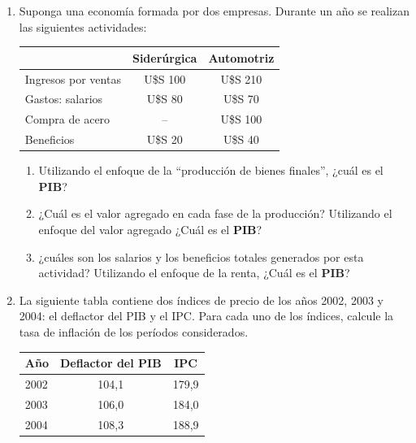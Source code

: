 \documentclass[11pt,addpoints]{article}
\begin{document}
\begin{enumerate}
\item Suponga una economía formada por dos empresas. Durante un año se realizan las siguientes
actividades:
\begin{center}
\begin{tabular}{lcc}
\toprule
 & \textbf{Siderúrgica} & \textbf{Automotriz}\\
\midrule
Ingresos por ventas & U\$S 100 & U\$S 210\\
Gastos: salarios & U\$S 80 & U\$S 70\\
Compra de acero & -- & U\$S 100\\
Beneficios & U\$S 20 & U\$S 40\\
\bottomrule
\end{tabular}
\end{center}
\begin{enumerate}[label=(\alph*)]
\item Utilizando el enfoque de la “producción de bienes finales”, ¿cuál es el \textbf{PIB}?
\item ¿Cuál es el valor agregado en cada fase de la producción? Utilizando el enfoque del valor
agregado ¿Cuál es el \textbf{PIB}?
\item ¿cuáles son los salarios y los beneficios totales generados por esta actividad? Utilizando
el enfoque de la renta, ¿Cuál es el \textbf{PIB}?
\end{enumerate}

\item La siguiente tabla contiene dos índices de precio de los años 2002, 2003 y 2004: el deflactor
del PIB y el IPC. Para cada uno de los índices, calcule la tasa de inflación de los períodos
considerados.
\begin{center}
\begin{tabular}{lcc}
\toprule
\textbf{Año} & \textbf{Deflactor del PIB} & \textbf{IPC}\\
\midrule
2002 & 104,1 & 179,9\\
2003 & 106,0 & 184,0\\
2004 & 108,3 & 188,9\\
\bottomrule
\end{tabular}
\end{center}


\newpage %
\vspace*{0.1cm} %



\end{enumerate}
\end{document}
